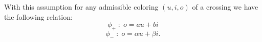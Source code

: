 With this assumption for any admissible coloring $(u,i,o)$ of a crossing we have the following relation:
$$\phi_+\;:\;o=au+bi$$
$$\phi_-\;:\;o=\alpha u+\beta i.$$


%
%
%
